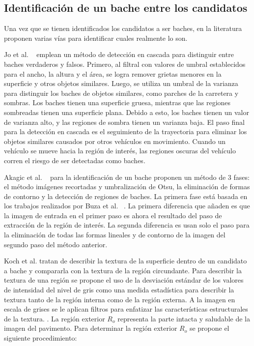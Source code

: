 \subsection{Identificación de un bache entre los candidatos}
Una vez que se tienen identificados los candidatos a ser baches, en la literatura proponen varias vías para  
identificar cuales realmente lo son.

Jo et al. ~ emplean un método de detección en cascada para distinguir
entre baches verdaderos y falsos. Primero, al filtral con valores de umbral establecidos para el ancho, la
altura y el área, se logra remover grietas menores en la superficie y otros objetos similares. Luego, 
se utiliza un umbral de la varianza para distinguir los baches de objetos similares, como parches de 
la carretera y sombras. Los baches tienen una superficie gruesa, mientras que las regiones sombreadas 
tienen una superficie plana. Debido a esto, los baches tienen un valor de varianza alto, y las regiones 
de sombra tienen un varianza baja. El paso final para la detección en cascada es el seguimiento de 
la trayectoria para eliminar los objetos similares causados por otros vehículos en movimiento. 
Cuando un vehículo se mueve hacia la región de interés, las regiones oscuras del vehículo
corren el riesgo de ser detectadas como baches.

Akagic et al. ~ para la identificación de un bache proponen un método de 3 fases:
el método imágenes recortadas y umbralización de Otsu, la eliminación de formas de contorno y la detección 
de regiones de baches. La primera fase está basada en los trabajos realizados por  Buza et al. ~.
La primera diferencia que añaden es que la imagen de entrada en el primer paso es ahora el resultado del paso de extracción 
de la región de interés. La segunda diferencia es usan solo el paso para la eliminación de todas las formas lineales y de contorno de la imagen del
segundo paso del método anterior.


Koch et al. tratan de describir la textura de la superficie dentro de un candidato a bache y compararla con la textura de la región circundante. 
Para describir la textura de una región se propone el uso de la desviación estándar de los valores de intensidad del nivel de gris como una 
medida estadística para describir la textura  tanto de la región interna como de la región externa. A la imagen en escala de grises se le 
aplican filtros para enfatizar las características estructurales de la textura. . La región exterior
$R_o$ representa la parte intacta y saludable de la imagen del pavimento.
Para determinar la región exterior $R_o$ se propone el siguiente procedimiento:

